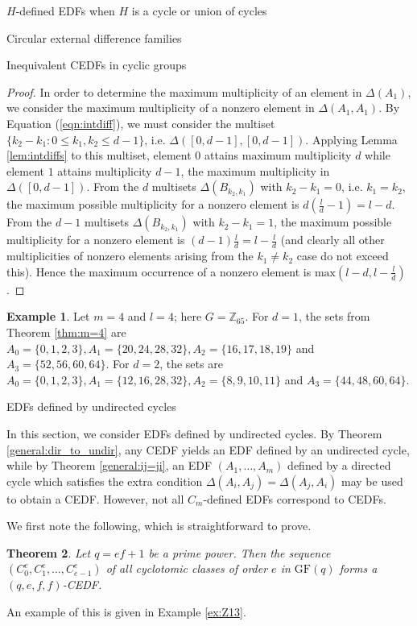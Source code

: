 \documentclass[12pt, a4paper]{article}
\newtheorem{theorem}{Theorem}[section]
\theoremstyle{definition}
\newtheorem{example}[theorem]{Example}
\begin{document}
\begin{section}{$H$-defined EDFs when $H$ is a cycle or union of cycles}
\begin{subsection}{Circular external difference families}
\begin{subsection}{Inequivalent CEDFs in cyclic groups}
\begin{proof}
In order to determine the maximum multiplicity of an element in $\Delta(A_1)$, we consider the maximum multiplicity of a nonzero element in $\Delta(A_1,A_1)$.  By Equation (\ref{eqn:intdiff}), we must consider the multiset $\{k_2-k_1: 0 \leq k_1,k_2 \leq d-1\}$, i.e. $\Delta([0,d-1],[0,d-1])$. Applying Lemma \ref{lem:intdiffs} to this multiset, element $0$ attains maximum multiplicity $d$ while element $1$ attains multiplicity $d-1$, the maximum multiplicity in $\Delta([0,d-1])$.  From the $d$ multisets $\Delta(B_{k_2,k_1})$ with $k_2-k_1=0$, i.e. $k_1=k_2$, the maximum possible multiplicity for a nonzero element is $d (\frac{l}{d}-1)=l-d$. From the $d-1$ multisets $\Delta(B_{k_2,k_1})$ with $k_2-k_1=1$, the maximum possible multiplicity for a nonzero element is $(d-1)\frac{l}{d}=l-\frac{l}{d}$ (and clearly all other multiplicities of nonzero elements arising from the $k_1 \neq k_2$ case do not exceed this). Hence the maximum occurrence of a nonzero element is $\mathrm{max}(l-d,l-\frac{l}{d})$.
\end{proof}


\begin{example}
Let $m=4$ and $l=4$; here $G=\mathbb{Z}_{65}$. For $d=1$, the sets from Theorem \ref{thm:m=4}  are $A_0=\{0,1,2,3\}, A_1=\{20,24,28,32\}, A_2=\{16,17,18,19\}$ and $A_3=\{52,56,60,64\}$.  For $d=2$, the sets are $A_0=\{0,1,2,3\}, A_1=\{12,16,28,32\}, A_2=\{8,9,10,11\}$ and $A_3=\{44,48,60,64\}$. 
\end{example}
\end{subsection}


\end{subsection}


\begin{subsection}{EDFs defined by undirected cycles}

In this section, we consider EDFs defined by undirected cycles.  By Theorem \ref{general:dir_to_undir}, any CEDF yields an EDF defined by an undirected cycle, while by Theorem \ref{general:ij=ji}, an EDF  $(A_1,\ldots, A_m)$ defined by a directed cycle which satisfies the extra condition $\Delta(A_i,A_j)=\Delta(A_j,A_i)$ may be used to obtain a CEDF.  However, not all $C_m$-defined EDFs correspond to CEDFs.

We first note the following, which is straightforward to prove.
\begin{theorem}
Let $q=ef+1$ be a prime power.  Then the sequence $(C_0^e,C_1^e, \ldots, C_{e-1}^e)$ of all cyclotomic classes of order $e$ in $\mathrm{GF}(q)$ forms a $(q,e,f,f)$-CEDF.
\end{theorem}
An example of this is given in Example \ref{ex:Z13}.



\end{subsection}
\end{section}
\end{document}
